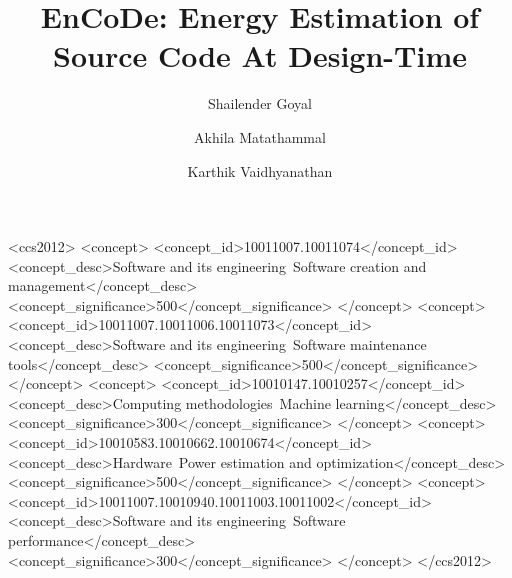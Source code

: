 \documentclass[sigconf]{acmart}
\begin{document}
\title{EnCoDe: Energy Estimation of Source Code At Design-Time}
\author{Shailender Goyal}

\author{Akhila Matathammal}

\author{Karthik Vaidhyanathan}

    

\begin{CCSXML}
<ccs2012>
   <concept>
       <concept_id>10011007.10011074</concept_id>
       <concept_desc>Software and its engineering~Software creation and management</concept_desc>
       <concept_significance>500</concept_significance>
       </concept>
   <concept>
       <concept_id>10011007.10011006.10011073</concept_id>
       <concept_desc>Software and its engineering~Software maintenance tools</concept_desc>
       <concept_significance>500</concept_significance>
       </concept>
   <concept>
       <concept_id>10010147.10010257</concept_id>
       <concept_desc>Computing methodologies~Machine learning</concept_desc>
       <concept_significance>300</concept_significance>
       </concept>
   <concept>
       <concept_id>10010583.10010662.10010674</concept_id>
       <concept_desc>Hardware~Power estimation and optimization</concept_desc>
       <concept_significance>500</concept_significance>
       </concept>
   <concept>
       <concept_id>10011007.10010940.10011003.10011002</concept_id>
       <concept_desc>Software and its engineering~Software performance</concept_desc>
       <concept_significance>300</concept_significance>
       </concept>
 </ccs2012>
\end{CCSXML}

\end{document}
